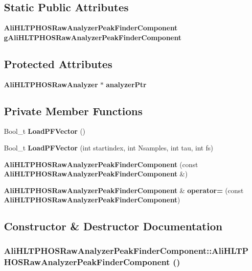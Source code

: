 \subsection*{Static Public Attributes}
\begin{CompactItemize}
\item 
{\bf Ali\-HLTPHOSRaw\-Analyzer\-Peak\-Finder\-Component} {\bf g\-Ali\-HLTPHOSRaw\-Analyzer\-Peak\-Finder\-Component}
\end{CompactItemize}
\subsection*{Protected Attributes}
\begin{CompactItemize}
\item 
{\bf Ali\-HLTPHOSRaw\-Analyzer} $\ast$ {\bf analyzer\-Ptr}
\end{CompactItemize}
\subsection*{Private Member Functions}
\begin{CompactItemize}
\item 
Bool\_\-t {\bf Load\-PFVector} ()
\item 
Bool\_\-t {\bf Load\-PFVector} (int startindex, int Nsamples, int tau, int fs)
\item 
{\bf Ali\-HLTPHOSRaw\-Analyzer\-Peak\-Finder\-Component} (const {\bf Ali\-HLTPHOSRaw\-Analyzer\-Peak\-Finder\-Component} \&)
\item 
{\bf Ali\-HLTPHOSRaw\-Analyzer\-Peak\-Finder\-Component} \& {\bf operator=} (const {\bf Ali\-HLTPHOSRaw\-Analyzer\-Peak\-Finder\-Component})
\end{CompactItemize}


\subsection{Constructor \& Destructor Documentation}
\subsubsection{\setlength{\rightskip}{0pt plus 5cm}Ali\-HLTPHOSRaw\-Analyzer\-Peak\-Finder\-Component::Ali\-HLTPHOSRaw\-Analyzer\-Peak\-Finder\-Component ()}\label{classAliHLTPHOSRawAnalyzerPeakFinderComponent_AliHLTPHOSRawAnalyzerPeakFinderComponenta0}




